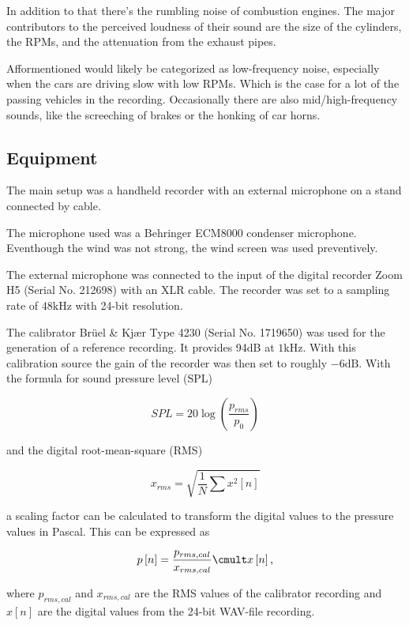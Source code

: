 \documentclass[twocolumn]{article}
\begin{document}
In addition to that there's the rumbling noise of combustion engines.
The major contributors to the perceived loudness of their sound are the size of the cylinders, the RPMs, and
the attenuation from the exhaust pipes.

Afformentioned would likely be categorized as low-frequency noise, especially when the cars are driving slow
with low RPMs.
Which is the case for a lot of the passing vehicles in the recording.
Occasionally there are also mid/high-frequency sounds, like the screeching of brakes or the honking of car horns.

\subsection{Equipment}
The main setup was a handheld recorder with an external microphone on a stand connected by cable.

The microphone used was a Behringer ECM8000 condenser microphone.
Eventhough the wind was not strong, the wind screen was used preventively.

The external microphone was connected to the input of the digital recorder Zoom H5 (Serial No. 212698) with
an XLR cable.
The recorder was set to a sampling rate of $48\textrm{kHz}$ with 24-bit resolution.

The calibrator Brüel \& Kjær Type 4230 (Serial No. 1719650) was used for the generation of a reference recording.
It provides 94dB at $1\textrm{kHz}$.
With this calibration source the gain of the recorder was then set to roughly $-6\textrm{dB}$.
With the formula for sound pressure level (SPL)

\begin{equation}
    SPL = 20\log\left(\frac{p_{rms}}{p_0}\right)
\end{equation}

and the digital root-mean-square (RMS)

\begin{equation}
    x_{rms} = \sqrt{\frac{1}{N}\sum x^2\left[n\right]}
\end{equation}

a scaling factor can be calculated to transform the digital values to the pressure values in Pascal.
This can be expressed as

\begin{equation}
    p\left[n\right] = \frac{p_{rms,cal}}{x_{rms,cal}}\cmult x\left[n\right]\textrm{,}
\end{equation}

where $p_{rms,cal}$ and $x_{rms,cal}$ are the RMS values of the calibrator recording
and $x\left[n\right]$ are the digital values from the 24-bit WAV-file recording.
\end{document}
